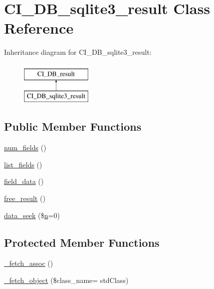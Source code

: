 \hypertarget{class_c_i___d_b__sqlite3__result}{}\section{C\+I\+\_\+\+D\+B\+\_\+sqlite3\+\_\+result Class Reference}
\label{class_c_i___d_b__sqlite3__result}
Inheritance diagram for C\+I\+\_\+\+D\+B\+\_\+sqlite3\+\_\+result\+:\begin{figure}[H]
\begin{center}
\leavevmode
\includegraphics[height=2.000000cm]{class_c_i___d_b__sqlite3__result}
\end{center}
\end{figure}
\subsection*{Public Member Functions}
\begin{DoxyCompactItemize}
\item 
\hyperlink{class_c_i___d_b__sqlite3__result_af831bf363e4d7d661a717a4932af449d}{num\+\_\+fields} ()
\item 
\hyperlink{class_c_i___d_b__sqlite3__result_a50b54eb4ea7cfd039740f532988ea776}{list\+\_\+fields} ()
\item 
\hyperlink{class_c_i___d_b__sqlite3__result_a84bffd65e53902ade1591716749a33e3}{field\+\_\+data} ()
\item 
\hyperlink{class_c_i___d_b__sqlite3__result_aad2d98d6beb3d6095405356c6107b473}{free\+\_\+result} ()
\item 
\hyperlink{class_c_i___d_b__sqlite3__result_a8255ae91816e4206e29eb7581c5af0f1}{data\+\_\+seek} (\$\hyperlink{cli_2error__general_8php_ace0fd03cd383f20ce6ea63247a207294}{n}=0)
\end{DoxyCompactItemize}
\subsection*{Protected Member Functions}
\begin{DoxyCompactItemize}
\item 
\hyperlink{class_c_i___d_b__sqlite3__result_a43a9a92817f1334a1c10752ec44275a0}{\+\_\+fetch\+\_\+assoc} ()
\item 
\hyperlink{class_c_i___d_b__sqlite3__result_ac0acae0a13c8bfe4c34198813ecf43a0}{\+\_\+fetch\+\_\+object} (\$class\+\_\+name= \textquotesingle{}std\+Class\textquotesingle{})
\end{DoxyCompactItemize}
